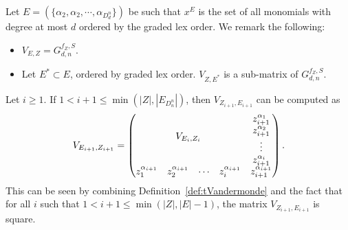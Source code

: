 \documentclass[11pt]{llncs}
\begin{document}
\begin{remark}\label{rem:subsetOfReedMuller}
Let $E = (\{\alpha_2, \alpha_2, \cdots, \alpha_{D_d^n}\})$ be such that $x^E$ is the set of all monomials with degree at most $d$ ordered by the graded lex order. 
    We remark the following:
    \begin{itemize}
        \item $V_{E,Z} = G_{d,n}^{f_{Z},S}$.
        \item Let $E^{*}\subset E$, ordered by graded lex order. $V_{Z,E^{*}}$ is a sub-matrix of $G_{d,n}^{f_Z, S}$.
    \end{itemize}
\end{remark}

\begin{remark}\label{rem:squareConstruction}
 Let $i\geq 1$. If $1< i+1 \leq \min{\left(|Z|, |E_{D_n^n}|\right)}$, then $V_{Z_{i+1}, E_{i+1}}$ can be computed as
    \begin{align*}
        V_{E_{i+1}, Z_{i+1}} = 
        \begin{pmatrix}
        \multicolumn{4}{c}{\multirow{4}{*}{$V_{E_{i}, Z_{i}}$}} & z_{i+1}^{\alpha_{1}}\\
        & & & & z_{i+1}^{\alpha_{2}}\\
        & & & & \vdots\\
        & & & & z_{i+1}^{\alpha_{i}}\\
        z_1^{\alpha_{i+1}} & z_2^{\alpha_{i+1}}& \cdots & z_{i}^{\alpha_{i+1}} & z_{i+1}^{\alpha_{i+1}}
    \end{pmatrix}.
    \end{align*}
    This can be seen by combining Definition~\ref{def:tVandermonde} and the fact that for all $i$ such that $1< i+1 \leq \min{\left(|Z|, |E|-1\right)}$, the matrix $V_{Z_{i+1}, E_{i+1}}$ is square.
\end{remark}
\end{document}
